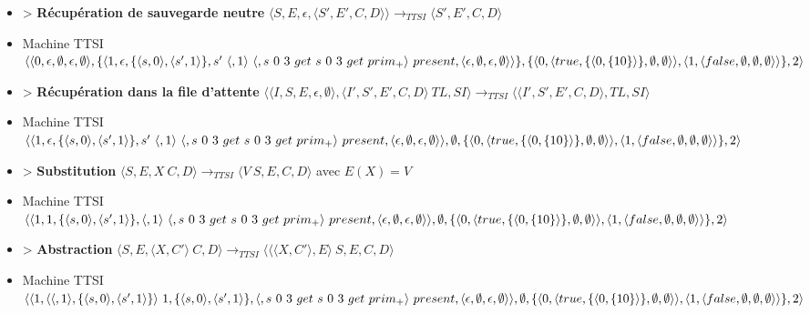 \documentclass[10pt,a4paper]{report}
\begin{document}
\begin{itemize}
 				\item[] > \textbf{Récupération de sauvegarde neutre} $\langle S,E,\epsilon,\langle S',E',C,D\rangle\rangle
 				\longrightarrow_{TTSI} 
 				\langle S',E',C,D\rangle$
 				\item[] Machine TTSI $\langle\langle 0,\epsilon,\emptyset,\epsilon,\emptyset\rangle,\{\langle 1,\epsilon,\{\langle s,0\rangle,\langle s',1\rangle\}, s'~\langle,1\rangle~\langle,s~0~3~get~s~0~3~get~prim_{+}\rangle~present ,\\\langle\epsilon,\emptyset,\epsilon,\emptyset\rangle\rangle\},\{\langle 0,\langle true,\{\langle 0,\{10\}\rangle\},\emptyset,\emptyset\rangle\rangle,\langle 1,\langle false,\emptyset,\emptyset,\emptyset\rangle\rangle\},2\rangle$
 				\item[] > \textbf{Récupération dans la file d'attente} $\langle\langle I,S,E,\epsilon,\emptyset\rangle,\langle I',S',E',C,D\rangle~TL,SI\rangle 
 				\longrightarrow_{TTSI} 
 				\langle\langle I',S',E',C,D\rangle,TL,SI\rangle$
 				\item[] Machine TTSI $\langle\langle 1,\epsilon,\{\langle s,0\rangle,\langle s',1\rangle\}, s'~\langle,1\rangle~\langle,s~0~3~get~s~0~3~get~prim_{+}\rangle~present ,\langle\epsilon,\emptyset,\epsilon,\emptyset\rangle\rangle,\emptyset,\{\langle 0,\langle true,\{\langle 0,\{10\}\rangle\},\emptyset,\emptyset\rangle\rangle,\\\langle 1,\langle false,\emptyset,\emptyset,\emptyset\rangle\rangle\},2\rangle$
 				\item[] > \textbf{Substitution} $\langle S,E,X~C,D\rangle
 				\longrightarrow_{TTSI} 
 				\langle V~S,E,C,D\rangle$ avec $E(X) = V$
 				\item[] Machine TTSI $\langle\langle 1,1,\{\langle s,0\rangle,\langle s',1\rangle\}, \langle,1\rangle~\langle,s~0~3~get~s~0~3~get~prim_{+}\rangle~present ,\langle\epsilon,\emptyset,\epsilon,\emptyset\rangle\rangle,\emptyset,\{\langle 0,\langle true,\{\langle 0,\{10\}\rangle\},\emptyset,\emptyset\rangle\rangle,\\\langle 1,\langle false,\emptyset,\emptyset,\emptyset\rangle\rangle\},2\rangle$
 				\item[] > \textbf{Abstraction} $\langle S,E,\langle X,C'\rangle~C,D\rangle
 				\longrightarrow_{TTSI} 
 				\langle \langle\langle X,C'\rangle,E\rangle~S,E,C,D\rangle$
 				\item[] Machine TTSI $\langle\langle 1,\langle\langle,1\rangle,\{\langle s,0\rangle,\langle s',1\rangle\}\rangle~1,\{\langle s,0\rangle,\langle s',1\rangle\}, \langle,s~0~3~get~s~0~3~get~prim_{+}\rangle~present ,\langle\epsilon,\emptyset,\epsilon,\emptyset\rangle\rangle,\emptyset,\\\{\langle 0,\langle true,\{\langle 0,\{10\}\rangle\},\emptyset,\emptyset\rangle\rangle,\langle 1,\langle false,\emptyset,\emptyset,\emptyset\rangle\rangle\},2\rangle$

\end{itemize}
\end{document}
